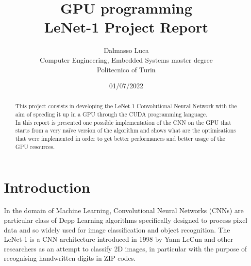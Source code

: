 \documentclass[a4paper]{report}
\begin{document}
\title{GPU programming \\ LeNet-1 Project Report}
\author{Dalmasso Luca\\
        Computer Engineering, Embedded Systems master degree\\
        Politecnico of Turin
        }

\date{01/07/2022}

\maketitle
\tableofcontents
\listoffigures
\listoftables


\begin{abstract}
This project consists in developing the LeNet-1 Convolutional Neural Network with the aim of speeding it up in a GPU through the CUDA programming language.\\
In this report is presented one possible implementation of the CNN on the GPU that starts from a very naïve version of the algorithm and shows what are the optimisations that were implemented in order to get better performances and better usage of the GPU resources.

\end{abstract}

\section{Introduction}
In the domain of Machine Learning, Convolutional Neural Networks (CNNs) are particular class of  Depp Learning algorithms specifically designed to process pixel data and so  widely used for image classification and object recognition.
The LeNet-1 is a CNN architecture introduced in 1998 by Yann LeCun and other researchers as an attempt to classify 2D images, in particular with the purpose of recognising handwritten digits in ZIP codes.

\end{document}
